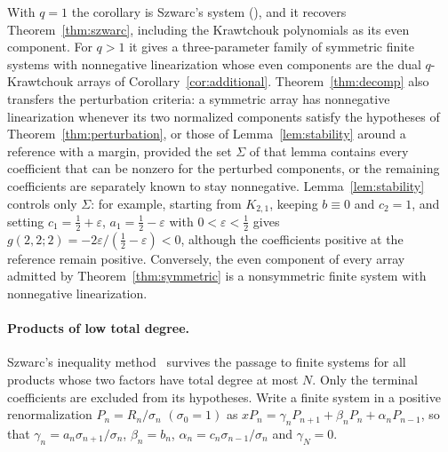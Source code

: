 \documentclass[twoside,10pt]{article}
\numberwithin{equation}{section}
\theoremstyle{slbody}
\theoremstyle{definition}
\theoremstyle{remark}
\renewcommand{\eqref}[1]{\textup{{\normalfont(\oldstylenums{\ref{#1}}}\normalfont)}}
\begin{document}
With $q=1$ the corollary is Szwarc's system \eqref{eq:qarray}, and it recovers Theorem~\ref{thm:szwarc}, including the Krawtchouk polynomials as its even component. For $q>1$ it gives a three-parameter family of symmetric finite systems with nonnegative linearization whose even components are the dual $q$-Krawtchouk arrays of Corollary~\ref{cor:additional}. Theorem~\ref{thm:decomp} also transfers the perturbation criteria: a symmetric array has nonnegative linearization whenever its two normalized components satisfy the hypotheses of Theorem~\ref{thm:perturbation}, or those of Lemma~\ref{lem:stability} around a reference with a margin, provided the set $\Sigma$ of that lemma contains every coefficient that can be nonzero for the perturbed components, or the remaining coefficients are separately known to stay nonnegative. Lemma~\ref{lem:stability} controls only $\Sigma$: for example, starting from $K_{2,1}$, keeping $b\equiv0$ and $c_2=1$, and setting $c_1=\tfrac12+\varepsilon$, $a_1=\tfrac12-\varepsilon$ with $0<\varepsilon<\tfrac12$ gives $g(2,2;2)=-2\varepsilon/(\tfrac12-\varepsilon)<0$, although the coefficients positive at the reference remain positive. Conversely, the even component of every array admitted by Theorem~\ref{thm:symmetric} is a nonsymmetric finite system with nonnegative linearization.

\paragraph{Products of low total degree.}
Szwarc's inequality method~\cite[Theorems~3.2 and~3.4]{szwarc} survives the passage to finite systems for all products whose two factors have total degree at most $N$. Only the terminal coefficients are excluded from its hypotheses. Write a finite system in a positive renormalization $P_n=R_n/\sigma_n$ $(\sigma_0=1)$ as $xP_n=\gamma_nP_{n+1}+\beta_nP_n+\alpha_nP_{n-1}$, so that $\gamma_n=a_n\sigma_{n+1}/\sigma_n$, $\beta_n=b_n$, $\alpha_n=c_n\sigma_{n-1}/\sigma_n$ and $\gamma_N=0$.
\end{document}
